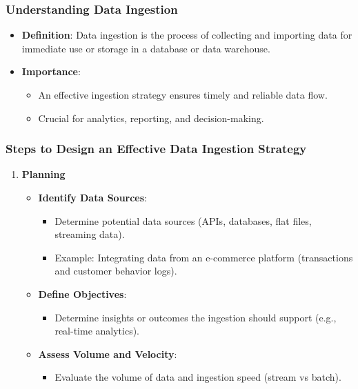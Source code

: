 \documentclass{beamer}
\begin{document}
\begin{frame}[fragile]
    \frametitle{Understanding Data Ingestion}
    \begin{itemize}
        \item \textbf{Definition}: Data ingestion is the process of collecting and importing data for immediate use or storage in a database or data warehouse.
        \item \textbf{Importance}: 
        \begin{itemize}
            \item An effective ingestion strategy ensures timely and reliable data flow.
            \item Crucial for analytics, reporting, and decision-making.
        \end{itemize}
    \end{itemize}
\end{frame}

\begin{frame}[fragile]
    \frametitle{Steps to Design an Effective Data Ingestion Strategy}
    \begin{enumerate}
        \item \textbf{Planning}
        \begin{itemize}
            \item \textbf{Identify Data Sources}: 
            \begin{itemize}
                \item Determine potential data sources (APIs, databases, flat files, streaming data).
                \item Example: Integrating data from an e-commerce platform (transactions and customer behavior logs).
            \end{itemize}
            \item \textbf{Define Objectives}: 
            \begin{itemize}
                \item Determine insights or outcomes the ingestion should support (e.g., real-time analytics).
            \end{itemize}
            \item \textbf{Assess Volume and Velocity}:  
            \begin{itemize}
                \item Evaluate the volume of data and ingestion speed (stream vs batch).
            \end{itemize}
        \end{itemize}
    \end{enumerate}
\end{frame}
\end{document}
